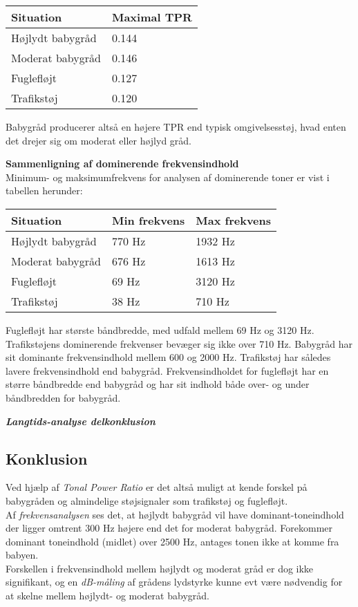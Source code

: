 \begin{center}
    \begin{tabular}{ | l | l |}
    \hline
    \textbf{Situation} & \textbf{Maximal TPR}  \\ \hline
    Højlydt babygråd & 0.144   \\ \hline
    Moderat babygråd & 0.146  \\ \hline
    Fuglefløjt & 0.127  \\ \hline
    Trafikstøj & 0.120  \\
    \hline
    \end{tabular}
\end{center}

Babygråd producerer altså en højere TPR end typisk omgivelsesstøj, hvad enten det drejer sig om moderat eller højlyd gråd.

\textbf{Sammenligning af dominerende frekvensindhold}	\\
Minimum- og maksimumfrekvens for analysen af dominerende toner er vist i tabellen herunder:
\begin{center}
    \begin{tabular}{ | l | l | l |}
    \hline
    \textbf{Situation} &	\textbf{Min frekvens}	& 	\textbf{Max frekvens}  \\ \hline
    Højlydt babygråd & 		770 Hz &					1932 Hz\\ \hline
    Moderat babygråd & 		676 Hz &					1613 Hz\\ \hline
    Fuglefløjt & 			69  Hz &					3120 Hz\\ \hline
    Trafikstøj & 			38  Hz &					710 Hz\\
    \hline
    \end{tabular}
\end{center}

Fuglefløjt har største båndbredde, med udfald mellem 69 Hz og 3120 Hz. Trafikstøjens dominerende frekvenser bevæger sig ikke over 710 Hz. Babygråd har sit dominante frekvensindhold mellem 600 og 2000 Hz. Trafikstøj har således lavere frekvensindhold end babygråd. Frekvensindholdet for fuglefløjt har en større båndbredde end babygråd og har sit indhold både over- og under båndbredden for babygråd.

\begin{center} \textit{\textbf{Langtids-analyse delkonklusion}} \end{center}

\subsection{Konklusion}
Ved hjælp af \textit{Tonal Power Ratio} er det altså muligt at kende forskel på babygråden og almindelige støjsignaler som trafikstøj og fuglefløjt. \\
Af \textit{frekvensanalysen} ses det, at højlydt babygråd vil have dominant-toneindhold der ligger omtrent 300 Hz højere end det for moderat babygråd. Forekommer dominant toneindhold (midlet) over 2500 Hz, antages tonen ikke at komme fra babyen. \\
Forskellen i frekvensindhold mellem højlydt og moderat gråd er dog ikke signifikant, og en \textit{dB-måling} af grådens lydstyrke kunne evt være nødvendig for at skelne mellem højlydt- og moderat babygråd.